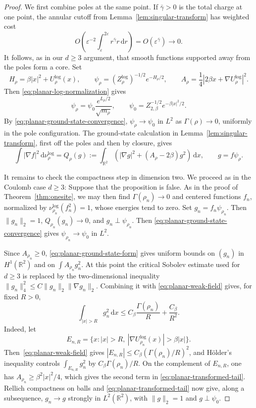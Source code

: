 \documentclass[12pt,reqno,letterpaper]{amsart}
\theoremstyle{definition}
\theoremstyle{remark}
\numberwithin{equation}{section}
\newcommand{\R}{\mathbb R}
\newcommand{\dd}{\,\mathrm d}
\newcommand{\be}{\beta}
\begin{document}
\begin{appendix}
\begin{proof}
We first combine poles at the same point.  If \(\bar\gamma>0\) is the total
charge at one point, the annular cutoff from
Lemma~\ref{lem:singular-transform} has weighted cost
\begin{equation}\label{eq:planar-pole-cutoff}
 O\!\left(\varepsilon^{-2}
 \int_\varepsilon^{2\varepsilon}r^{\bar\gamma}r\dd r\right)
 =O(\varepsilon^{\bar\gamma})\longrightarrow0.
\end{equation}
It follows, as in our $d\ge 3$ argument, that smooth functions supported away from the poles form a core.
Set
\[
 H_\rho=\be|x|^2+U_\rho^{\log}(x),
 \qquad
 \psi_\rho=(Z_\rho^{\log})^{-1/2}e^{-H_\rho/2},
 \qquad
 A_\rho=\frac14|2\be x+\nabla U_\rho^{\log}|^2.
\]
Then \eqref{eq:planar-log-normalization} gives
\[
 \psi_\rho
 =\psi_0\frac{e^{L_\rho/2}}{\sqrt{m_\rho}},
 \qquad
 \psi_0=Z_{2,\be}^{-1/2}e^{-\be|x|^2/2}.
\]
By \eqref{eq:planar-ground-state-convergence},
\(\psi_\rho\to\psi_0\) in \(L^2\) as \(\Gamma(\rho)\to0\), uniformly in
the pole configuration.  The ground-state calculation in
Lemma~\ref{lem:singular-transform}, first off the poles and then by closure,
gives
\begin{equation}\label{eq:planar-ground-state-form}
 \int|\nabla f|^2\dd\nu_\rho^{\log}
 =Q_\rho(g)
 :=\int_{\R^2}\left(|\nabla g|^2+(A_\rho-2\be)g^2\right)\dd x,
 \qquad g=f\psi_\rho.
\end{equation}


It remains to check the compactness step in dimension two.  We proceed as in the Coulomb case $d \ge 3$: Suppose that the
proposition is false.  As in the proof of Theorem~\ref{thm:onesite}, we may
then find \(\Gamma(\rho_n)\to0\) and centered functions \(f_n\), normalized by
\(\nu_{\rho_n}^{\log}(f_n^2)=1\), whose energies tend to zero.  Set
\(g_n=f_n\psi_{\rho_n}\).  Then
\(\|g_n\|_2=1\), \(Q_{\rho_n}(g_n)\to0\), and
\(g_n\perp\psi_{\rho_n}\).  Then
\eqref{eq:planar-ground-state-convergence} gives
\(\psi_{\rho_n}\to\psi_0\) in \(L^2\).

Since \(A_{\rho_n}\ge0\), \eqref{eq:planar-ground-state-form} gives uniform
bounds on \((g_n)\) in \(H^1(\R^2)\) and on
\(\int A_{\rho_n}g_n^2\).  At this point the critical Sobolev estimate used
for \(d\ge3\) is replaced by the two-dimensional inequality
\(\|g_n\|_4^2\le C\|g_n\|_2\|\nabla g_n\|_2\).  Combining it with
\eqref{eq:planar-weak-field} gives, for fixed \(R>0\),
\begin{equation}\label{eq:planar-transformed-tail}
 \int_{|x|>R}g_n^2\dd x
 \le C_\be\frac{\Gamma(\rho_n)}R+
 \frac{C_\be}{R^2}.
\end{equation}
Indeed, let
\[
 E_{n,R}=\{x:|x|>R,\ |\nabla U_{\rho_n}^{\log}(x)|>\be|x|\}.
\]
Then~\eqref{eq:planar-weak-field} gives
\(|E_{n,R}|\le C_\be(\Gamma(\rho_n)/R)^2\), and H\"older's inequality
controls \(\int_{E_{n,R}}g_n^2\) by \(C_\be\Gamma(\rho_n)/R\).  On the
complement of \(E_{n,R}\), one has
\(A_{\rho_n}\ge\be^2|x|^2/4\), which gives the second term in
\eqref{eq:planar-transformed-tail}.  Rellich compactness on balls and
\eqref{eq:planar-transformed-tail} now give, along a subsequence,
\(g_n\to g\) strongly in \(L^2(\R^2)\), with \(\|g\|_2=1\) and
\(g\perp\psi_0\).


\end{proof}
\end{appendix}
\end{document}
